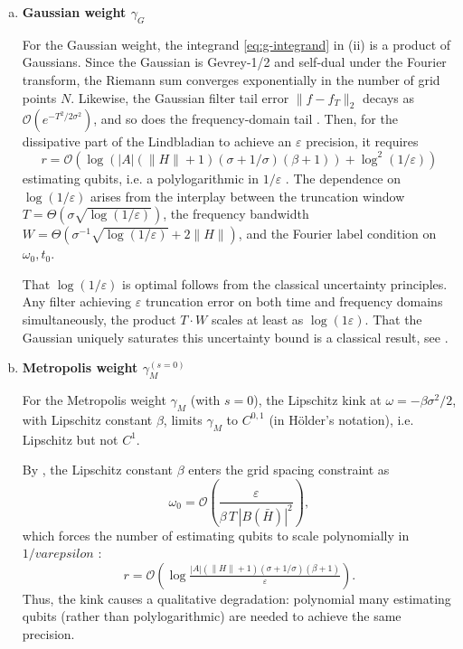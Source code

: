 \begin{enumerate}[(a)]
    \item \textbf{Gaussian weight $\gamma_G$}
    
    For the Gaussian weight, the integrand \eqref{eq:g-integrand} in (ii) is a product of Gaussians. Since the Gaussian is Gevrey-1/2 \cite[Proposition B.1]{hoepfner2019global} and self-dual under the Fourier transform, the Riemann sum converges exponentially in the number of grid points $N$. Likewise, the Gaussian filter tail error $\|f - f_T\|_2$ decays as $\mathcal{O}(e^{-T^2/2\sigma^2})$, and so does the frequency-domain tail \cite[Proposition A.9]{chen2023quantum}. Then, for the dissipative part of the Lindbladian to achieve an $\varepsilon$ precision, it requires 
    $$
    r = \mathcal{O}\!\left(\log\!\left(|A|(\|H\|{+}1)(\sigma{+}1/\sigma)(\beta{+}1)\right) + \log^2(1/\varepsilon)\right)
    $$
    estimating qubits, i.e. a polylogarithmic in $1/\varepsilon$ \cite[Corollary C.2]{chen2023quantum}. The dependence on $\log(1/\varepsilon)$ arises from the interplay between the truncation window $T = \Theta(\sigma \sqrt{\log(1/\varepsilon)})$, the frequency bandwidth $W = \Theta(\sigma^{-1}\sqrt{\log(1/\varepsilon)} + 2\|H\|)$, and the Fourier label condition on $\omega_0, t_0$. 
    
   That $\log(1/\varepsilon)$ is optimal follows from the classical uncertainty principles. Any filter achieving $\varepsilon$ truncation error on both time and frequency domains simultaneously, the product $T\cdot W$ scales at least as $\log(1 \varepsilon)$. That the Gaussian uniquely saturates this uncertainty bound is a classical result, see \cite{folland1997uncertainty}.
    
    \item \textbf{Metropolis weight $\gamma_M^{(s=0)}$}
    
    For the Metropolis weight $\gamma_M$ (with $s = 0$), the Lipschitz kink at $\omega = -\beta\sigma^2 / 2$, with Lipschitz constant $\beta$, limits $\gamma_M$ to $C^{0, 1}$ (in Hölder's notation), i.e. Lipschitz but not $C^1$. 
    
    By \cite[Proposition C.1]{chen2023quantum}, the Lipschitz constant $\beta$ enters the grid spacing constraint as
    $$
        \omega_0 = \mathcal{O}\!\left(\frac{\varepsilon}{\beta\, T\, |B(\bar{H})|^2}\right),
    $$
    which forces the number of estimating qubits to scale polynomially in $1 / varepsilon$ \cite[Corollary C.2]{chen2023quantum}: 
    $$
        r = \mathcal{O}\left(\log\tfrac{|A|(\|H\|+1)(\sigma + 1/\sigma)(\beta+1)}{\varepsilon}\right).
    $$
    Thus, the kink causes a qualitative degradation: polynomial many estimating qubits (rather than polylogarithmic) are needed to achieve the same precision.
    

\end{enumerate}
